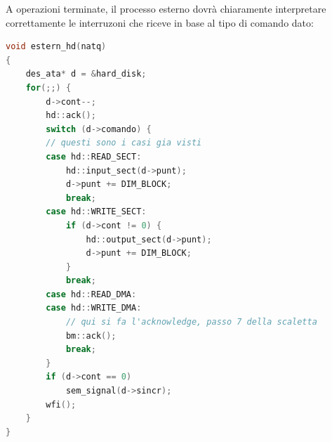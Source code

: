 \documentclass[a4paper,11pt]{article}
\begin{document}
A operazioni terminate, il processo esterno dovrà chiaramente interpretare correttamente le interruzoni che riceve in base al tipo di comando dato:
\begin{lstlisting}[language=C++, style=codestyle]	
void estern_hd(natq)
{
	des_ata* d = &hard_disk;
	for(;;) {
		d->cont--;
		hd::ack();
		switch (d->comando) {
		// questi sono i casi gia visti
		case hd::READ_SECT:
			hd::input_sect(d->punt);
			d->punt += DIM_BLOCK;
			break;
		case hd::WRITE_SECT:
			if (d->cont != 0) {
				hd::output_sect(d->punt);
				d->punt += DIM_BLOCK;
			}
			break;
		case hd::READ_DMA:
		case hd::WRITE_DMA:
			// qui si fa l'acknowledge, passo 7 della scaletta
			bm::ack();
			break;
		}
		if (d->cont == 0)
			sem_signal(d->sincr);
		wfi();
	}
}
\end{lstlisting}
\end{document}
